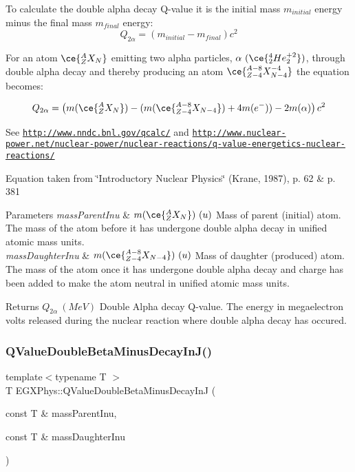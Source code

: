 To calculate the double alpha decay Q-\/value it is the initial mass $m_{initial}$ energy minus the final mass $m_{final}$ energy\+: \[Q_{2\alpha} = \left ( m_{initial}-m_{final}\right ) c^2\]

For an atom $\ce{ ^{A}_{Z}X_{N} }$ emitting two alpha particles, $\alpha\ (\ce{ ^{4}_{2}He^{+2}_{2} })$, through double alpha decay and thereby producing an atom $\ce{ ^{A-8}_{Z{-4}}X^{-4}_{N-4} }$ the equation becomes\+:

\[Q_{2\alpha} = \left ( m(\ce{ ^{A}_{Z}X_{N} }) - (m(\ce{ ^{A-8}_{Z{-4}}X_{N-4} }) + 4m(e^-)) - 2m(\alpha)\right ) c^2\]

See \href{http://www.nndc.bnl.gov/qcalc/}{\tt http\+://www.\+nndc.\+bnl.\+gov/qcalc/} and \href{http://www.nuclear-power.net/nuclear-power/nuclear-reactions/q-value-energetics-nuclear-reactions/}{\tt http\+://www.\+nuclear-\/power.\+net/nuclear-\/power/nuclear-\/reactions/q-\/value-\/energetics-\/nuclear-\/reactions/}

Equation taken from \char`\"{}\+Introductory Nuclear Physics\char`\"{} (Krane, 1987), p. 62 \& p. 381


\begin{DoxyParams}{Parameters}
{\em mass\+Parent\+Inu} & $m(\ce{ ^{A}_{Z}X_{N} })\ (u)$ Mass of parent (initial) atom. The mass of the atom before it has undergone double alpha decay in unified atomic mass units. \\
\hline
{\em mass\+Daughter\+Inu} & $m(\ce{ ^{A-8}_{Z{-4}}X_{N-4} })\ (u)$ Mass of daughter (produced) atom. The mass of the atom once it has undergone double alpha decay and charge has been added to make the atom neutral in unified atomic mass units. \\
\hline
\end{DoxyParams}
\begin{DoxyReturn}{Returns}
$Q_{2\alpha}\ (MeV)$ Double Alpha decay Q-\/value. The energy in megaelectron volts released during the nuclear reaction where double alpha decay has occured. 
\end{DoxyReturn}
\mbox{\label{group___q_value_gaf19d189152aec04d8b1ebbbe8792540b}} 
\subsubsection{\texorpdfstring{Q\+Value\+Double\+Beta\+Minus\+Decay\+In\+J()}{QValueDoubleBetaMinusDecayInJ()}}
{\footnotesize\ttfamily template$<$typename T $>$ \\
T E\+G\+X\+Phys\+::\+Q\+Value\+Double\+Beta\+Minus\+Decay\+InJ (\begin{DoxyParamCaption}\item[{const T \&}]{mass\+Parent\+Inu,  }\item[{const T \&}]{mass\+Daughter\+Inu }\end{DoxyParamCaption})}



